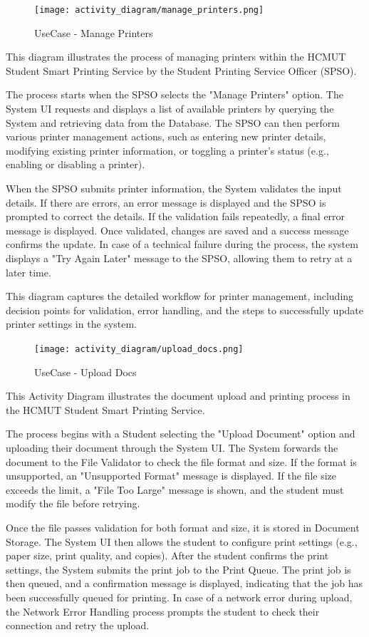 \begin{figure}[H]
    \centering
    \texttt{[image: activity\_diagram/manage\_printers.png]}
    \caption{UseCase - Manage Printers}
\end{figure}
This diagram illustrates the process of managing printers within the HCMUT Student Smart Printing Service by the Student Printing Service Officer (SPSO).

The process starts when the SPSO selects the "Manage Printers" option. The System UI requests and displays a list of available printers by querying the System and retrieving data from the Database. The SPSO can then perform various printer management actions, such as entering new printer details, modifying existing printer information, or toggling a printer's status (e.g., enabling or disabling a printer).

When the SPSO submits printer information, the System validates the input details. If there are errors, an error message is displayed and the SPSO is prompted to correct the details. If the validation fails repeatedly, a final error message is displayed. Once validated, changes are saved and a success message confirms the update. In case of a technical failure during the process, the system displays a "Try Again Later" message to the SPSO, allowing them to retry at a later time.

This diagram captures the detailed workflow for printer management, including decision points for validation, error handling, and the steps to successfully update printer settings in the system.


\begin{figure}[H]
    \centering
    \texttt{[image: activity\_diagram/upload\_docs.png]}
    \caption{UseCase - Upload Docs}
\end{figure}
This Activity Diagram illustrates the document upload and printing process in the HCMUT Student Smart Printing Service. 

The process begins with a Student selecting the "Upload Document" option and uploading their document through the System UI. The System forwards the document to the File Validator to check the file format and size. If the format is unsupported, an "Unsupported Format" message is displayed. If the file size exceeds the limit, a "File Too Large" message is shown, and the student must modify the file before retrying.

Once the file passes validation for both format and size, it is stored in Document Storage. The System UI then allows the student to configure print settings (e.g., paper size, print quality, and copies). After the student confirms the print settings, the System submits the print job to the Print Queue.
The print job is then queued, and a confirmation message is displayed, indicating that the job has been successfully queued for printing. In case of a network error during upload, the Network Error Handling process prompts the student to check their connection and retry the upload.

